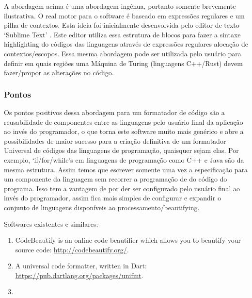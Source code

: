 {    A abordagem acima é uma abordagem ingênua, portanto somente brevemente ilustrativa. O real motor
    para o software é baseado em expressões regulares e um pilha de contextos. Esta ideia foi
    inicialmente desenvolvida pelo editor de texto `Sublime Text' \cite{Skinner}. Este editor
    utiliza essa estrutura de blocos para fazer a sintaxe highlighting do códigos das linguagens
    através de expressões regulares alocação de contextos/escopos. Essa mesma abordagem pode ser
    utilizada pelo usuário para definir em quais regiões uma Máquina de Turing (linguagens C++/Rust)
    devem fazer/propor as alterações no código.


\subsubsection{Pontos}

    Os pontos positivos dessa abordagem para um formatador de código são a reusabilidade de
    componentes entre as linguagens pelo usuário final da aplicação ao invés do programador, o que
    torna este software muito mais genérico e abre a possibilidades de maior sucesso para a criação
    definitiva de um formatador Universal de códigos das linguagens de programação, quaisquer sejam
    elas. Por exemplo, `if/for/while'\textquotesingle s em linguagens de programação como C++ e Java
    são da mesma estrutura. Assim temos que escrever somente uma vez a especificação para um
    componente da linguagem sem recorrer a programação de do código do programa. Isso tem a vantagem
    de por der ser configurado pelo usuário final ao invés do programador, assim fica mais simples
    de configurar e expandir o conjunto de linguagens disponíveis ao processamento/beautifying.

    Softwares existentes e similares:

    \medskip
    \begin{myquote}
    \begin{enumerate}[leftmargin=*]

        \item

        CodeBeautify is an online code beautifier which allows you to beautify your source code:
        \url{http://codebeautify.org/}.

        \item

        A universal code formatter, written in Dart: \url{https://pub.dartlang.org/packages/unifmt}.

        \item


\end{enumerate}
\end{myquote}}
